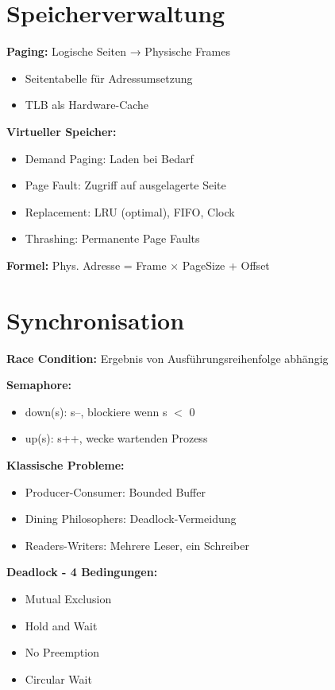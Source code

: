 \documentclass[10pt,a4paper]{article}
\begin{document}
\begin{multicols}{2}
\section{Speicherverwaltung}
\textbf{Paging:} Logische Seiten → Physische Frames
\begin{itemize}
\item Seitentabelle für Adressumsetzung
\item TLB als Hardware-Cache
\end{itemize}

\textbf{Virtueller Speicher:}
\begin{itemize}
\item Demand Paging: Laden bei Bedarf
\item Page Fault: Zugriff auf ausgelagerte Seite
\item Replacement: LRU (optimal), FIFO, Clock
\item Thrashing: Permanente Page Faults
\end{itemize}

\textbf{Formel:} Phys. Adresse = Frame × PageSize + Offset

\section{Synchronisation}
\textbf{Race Condition:} Ergebnis von Ausführungsreihenfolge abhängig

\textbf{Semaphore:}
\begin{itemize}
\item down(s): s--, blockiere wenn s $<$ 0
\item up(s): s++, wecke wartenden Prozess
\end{itemize}

\textbf{Klassische Probleme:}
\begin{itemize}
\item Producer-Consumer: Bounded Buffer
\item Dining Philosophers: Deadlock-Vermeidung
\item Readers-Writers: Mehrere Leser, ein Schreiber
\end{itemize}

\textbf{Deadlock - 4 Bedingungen:}
\begin{itemize}
\item Mutual Exclusion
\item Hold and Wait
\item No Preemption
\item Circular Wait
\end{itemize}


\end{multicols}
\end{document}
